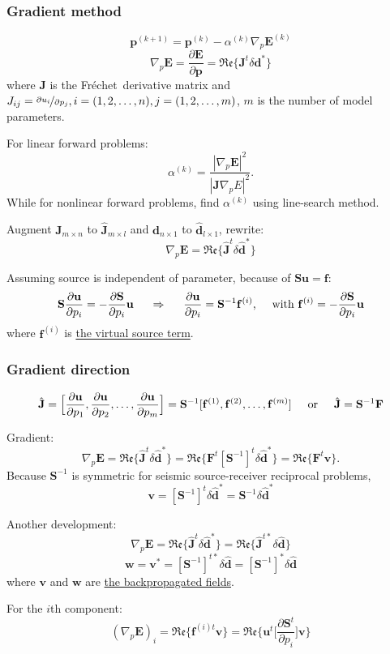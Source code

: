 \documentclass{article}
\newcommand{\mbf}[1]{\mathbf{#1}}
\newcommand{\myem}[1]{{\color{red}\uline{#1}}}
\newcommand{\myRe}{\mathfrak{Re}}
\newcommand{\Frechet}{Fr\'{e}chet~}
\begin{document}
\subsubsection{Gradient method}
\[ \mbf p^{(k+1)}=\mbf p^{(k)}-\alpha^{(k)}\nabla_p\mbf E^{(k)} \]
\[ \nabla_p\mbf E=\frac{\partial\mbf E}{\partial\mbf p}=\myRe\{\mbf J^t\delta\mbf d^*\} \]
where $\mbf J$ is the \Frechet derivative matrix and $J_{ij}=\nicefrac{\partial u_i}{\partial p_j},i=(1,2,\ldots,n),j=(1,2,\ldots,m)$, $m$ is the number of model parameters.\par
For linear forward problems:
\[ \alpha^{(k)}=\frac{|\nabla_p\mbf E|^2}{|\mbf J\nabla_p E|^2}. \]
While for nonlinear forward problems, find $\alpha^{(k)}$ using line-search method.\par
Augment $\mbf J_{m\times n}$ to $\hat{\mbf J}_{m\times l}$ and $\mbf d_{n\times 1}$ to $\hat{\mbf d}_{l\times 1}$, rewrite:
\[ \nabla_p\mbf E=\myRe\{\hat{\mbf J}^t\delta\hat{\mbf d}^* \} \]\par
Assuming source is independent of parameter, because of $\mbf S\mbf u=\mbf f$:
\[ \mbf S\frac{\partial\mbf u}{\partial p_i}=-\frac{\partial\mbf S}{\partial p_i}\mbf u \hspace{5mm}\Rightarrow\hspace{5mm} \frac{\partial\mbf u}{\partial p_i}=\mbf S^{-1}\mbf f^{(i)} \text{,\hspace{5mm}with~} \mbf f^{(i)}=-\frac{\partial\mbf S}{\partial p_i}\mbf u\]
where $\mbf f^{(i)}$ is \myem{the virtual source term}.\par
\subsubsection{Gradient direction}
\[ \hat{\mbf J}=\Big[\frac{\partial\mbf u}{\partial p_1},\frac{\partial\mbf u}{\partial p_2},\ldots,\frac{\partial\mbf u}{\partial p_m}\Big]=\mbf S^{-1}[\mbf f^{(1)},\mbf f^{(2)},\ldots,\mbf f^{(m)}] \text{\hspace{5mm}or\hspace{5mm}} \hat{\mbf J}=\mbf S^{-1}\mbf F \]\par
Gradient:
\[ \nabla_p\mbf E=\myRe\{\hat{\mbf J}^t\delta\hat{\mbf d}^*\}=\myRe\{\mbf F^t[\mbf S^{-1}]^t\delta\hat{\mbf d}^*\}=\myRe\{\mbf F^t\mbf v\}. \]
Because $\mbf S^{-1}$ is symmetric for seismic source-receiver reciprocal problems,
\[ \mbf v=[\mbf S^{-1}]^t\delta\hat{\mbf d}^*=\mbf S^{-1}\delta\hat{\mbf d}^* \]\par
Another development:
\[ \nabla_p\mbf E=\myRe\{\hat{\mbf J}^t\delta\hat{\mbf d}^*\}=\myRe\{\hat{\mbf J}^{t*}\delta\hat{\mbf d}\} \]
\[ \mbf w=\mbf v^*=[\mbf S^{-1}]^{t*}\delta\hat{\mbf d}=[\mbf S^{-1}]^*\delta\hat{\mbf d} \]
where $\mbf v$ and $\mbf w$ are \myem{the backpropagated fields}.\par
For the $i$th component:
\[ (\nabla_p\mbf E)_i=\myRe\{\mbf f^{(i)t}\mbf v\}=\myRe\{\mbf u^t\Big[\frac{\partial\mbf S^t}{\partial p_i}\Big]\mbf v\} \]\par
\end{document}
